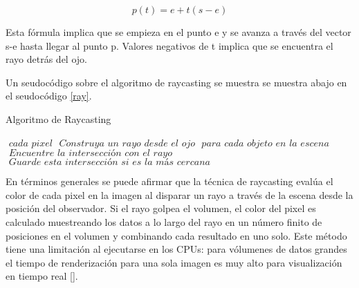 \begin{equation}
\label{eq:ray_definition}
  p(t) = e+t(s-e)
\end{equation}

Esta fórmula implica que se empieza en el punto e y se avanza a través del vector s-e hasta llegar al punto p. Valores negativos de t implica que se encuentra el rayo detrás del ojo.

Un seudocódigo sobre el algoritmo de raycasting se muestra se muestra abajo en el seudocódigo \ref{ray}.

\begin{algorithm}
\caption{Algoritmo de Raycasting}\label{ray}
\begin{algorithmic}[1]
\For $\textit{ cada pixel}$
\State $\textit{ Construya un rayo desde el ojo}$
\For $\textit{ para cada objeto en la escena}$
\State $\textit{ Encuentre la intersección con el rayo}$
\State $\textit{ Guarde esta intersección si es la más cercana}$
\EndFor
\EndFor
\EndProcedure
\end{algorithmic}
\end{algorithm}





En términos generales se puede afirmar que la técnica de raycasting evalúa el color de cada pixel en la imagen al disparar un rayo a través de la escena desde la posición del observador. Si el rayo golpea el volumen, el color del pixel es calculado muestreando los datos a lo largo del rayo en un número finito de posiciones en el volumen  y combinando cada resultado en uno solo. Este método tiene una limitación al ejecutarse en los CPUs: para vólumenes de datos grandes el tiempo de renderización para una sola imagen es muy alto para visualización en tiempo real [\cite{Marques2009}].

